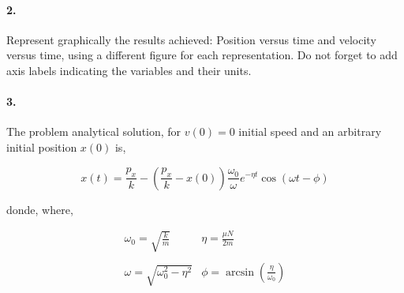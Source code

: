 \begin{paracol}{2}
\paragraph{2.} \label{p2} Represent graphically the results achieved: Position versus time and velocity versus time, using a different figure for each representation. Do not forget to add axis labels indicating the variables and their units.	 

\paragraph{3.} The problem analytical solution, for $v(0)=0$ initial speed and an arbitrary initial position $x(0)$ is, 
\end{paracol}
\begin{equation}\label{eq2}
	x(t) = \frac{p_x}{k}-\left(\frac{p_x}{k}-x(0)\right)\frac{\omega_0}{\omega}e^{-\eta t}\cos\left(\omega t-\phi \right)
\end{equation}
\begin{paracol}{2}
donde,
\switchcolumn
where,
\end{paracol}
\begin{equation}
\begin{matrix}
\omega_0 = \sqrt{\frac{k}{m}} & \eta = \frac{\mu N}{2m}\\
\ & \ \\
\omega = \sqrt{\omega_0^2 -\eta^2} &
\phi = \arcsin \left(\frac{\eta}{\omega_0}\right)
\end{matrix} \nonumber
\end{equation}
 
